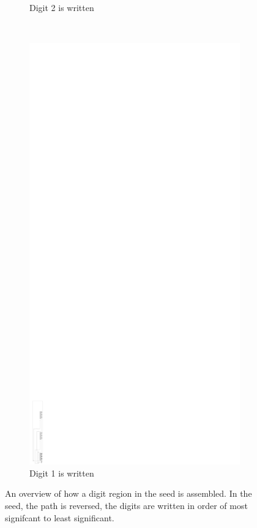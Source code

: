 \documentclass[10pt]{article}
\begin{document}
\begin{figure}
\begin{subfigure}[t]{0.23\textwidth}
        \caption{\label{fig:mid_level_timeline_phase_3} Digit 2 is written }
    \end{subfigure}%
    ~
    \begin{subfigure}[t]{0.23\textwidth}
        \centering
        \includegraphics[width=.85in,valign=t]{mid_level_timeline_phase_4}
        \caption{\label{fig:mid_level_timeline_phase_4} Digit 1 is written }
    \end{subfigure}

    \caption{\label{fig:mid_level_timeline_overview} An overview of how a digit region in the seed is assembled. In the seed, the path is reversed, the digits are written in order of most signifcant to least significant. }
\end{figure}
\end{document}
